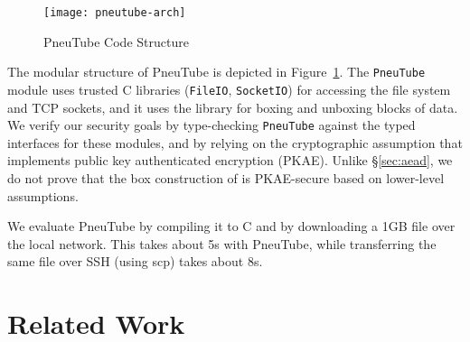 \documentclass[acmsmall,review,anonymous]{acmart}\settopmatter{printfolios=true}
\let\li\lstinline
\begin{document}
\begin{figure}
\centerline{\texttt{[image: pneutube-arch]}}
\caption{PneuTube Code Structure}
\label{fig:pneutube-arch}
\end{figure}

The modular structure of PneuTube is depicted in Figure~\ref{fig:pneutube-arch}.
%
The \li$PneuTube$ module uses trusted C libraries (\li$FileIO$, \li$SocketIO$)
for accessing the file system and TCP sockets, and it uses the \haclstar library 
for boxing and unboxing blocks of data.
%
We verify our security goals by type-checking \li$PneuTube$ against the typed
interfaces for these modules, and by relying on the cryptographic assumption
that \haclstar implements public key authenticated encryption (PKAE).
%
Unlike \S\ref{sec:aead}, we do not prove that the box construction of
\haclstar is PKAE-secure based on lower-level assumptions.

We evaluate PneuTube by compiling it to C and by downloading a 1GB
file over the local network. This takes about 5s with PneuTube, while
transferring the same file over SSH (using scp) takes about 8s. 
\fi

\iffalse
Leveraging on our previous PKAE example, we build a secure file transfer application that
consumes our \textit{box} API. We model typestate by
tying the state of a TCP socket to the current (monadic) heap.

\begin{lstlisting}
module Tcp
val close: s:socket -> Stack bool
  (requires (fun h0 -> current_state h0 s = Open))
  (ensures  (fun _ r h1 -> r ==> current_state h1 s = Closed))
\end{lstlisting}
\fi

\section{Related Work}
\label{sec:related}


\end{document}
